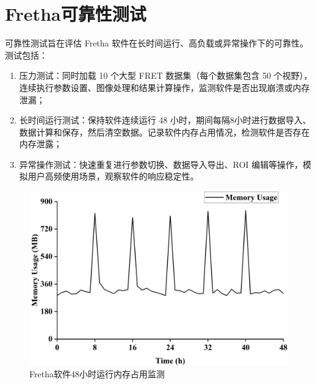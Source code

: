 \section{Fretha可靠性测试}
可靠性测试旨在评估 Fretha 软件在长时间运行、高负载或异常操作下的可靠性。测试包括：
\begin{enumerate}
  \item 压力测试：同时加载 10 个大型 FRET 数据集（每个数据集包含 50 个视野），连续执行参数设置、图像处理和结果计算操作，监测软件是否出现崩溃或内存泄漏；
  \item 长时间运行测试：保持软件连续运行 48 小时，期间每隔8小时进行数据导入、数据计算和保存，然后清空数据。记录软件内存占用情况，检测软件是否存在内存泄露；
  \item 异常操作测试：快速重复进行参数切换、数据导入导出、ROI 编辑等操作，模拟用户高频使用场景，观察软件的响应稳定性。
\end{enumerate}

\begin{figure}[tp]
  \centering
  \includegraphics[width=0.6\linewidth]{../figures/3/测试-48小时内存波动.drawio.png}
  \caption{Fretha软件48小时运行内存占用监测}
  \label{fig:48小时内存变化}
\end{figure}

